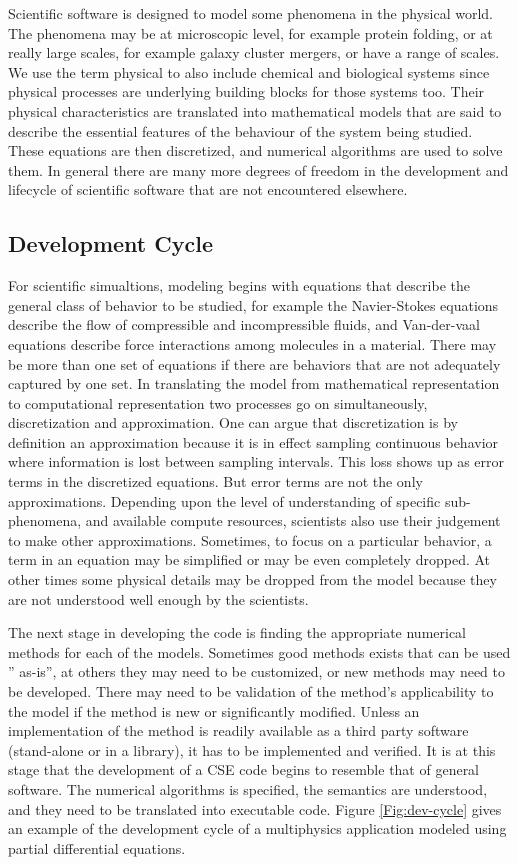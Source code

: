 \label{sec:lifecycle} 
Scientific software is designed to model some phenomena in the
physical world. The phenomena may be at microscopic level, for example
protein folding, or at really large scales, for example galaxy cluster
mergers, or have a range of scales. We use the term physical to also include chemical and
biological systems since physical processes are underlying building
blocks for those systems too. Their physical characteristics are
translated into mathematical models that are said to describe the
essential features of the behaviour of the system being
studied. These equations are then discretized, and numerical algorithms
are used to solve them. In general there are many more degrees of
freedom in the development and lifecycle of scientific software
that are not encountered elsewhere. 

\subsection{Development Cycle}
\label{sec:dev-cycle}
For scientific simualtions, modeling begins with equations that describe the
general class of behavior to be studied, for example the Navier-Stokes
equations describe the flow of compressible and incompressible
fluids, and Van-der-vaal equations describe force interactions among
molecules in a material. There may be more than one set of equations
if there are behaviors that are not adequately captured by one set.
In translating the model from mathematical representation to
computational representation two processes go on simultaneously,
discretization and approximation. One can argue that discretization is
by definition an approximation because it is in effect sampling
continuous behavior where information is lost between sampling
intervals. This loss shows up as error terms in the discretized
equations. But error terms are not the only
approximations. Depending upon the level of understanding of specific
sub-phenomena, and available compute resources, scientists also 
use their judgement to make other approximations. Sometimes, to focus on a
particular behavior, a term in an equation may be simplified or may be even completely
dropped. At other times some physical details may be dropped
from the model because they are not understood well enough by the
scientists. 

The next stage in developing the code is finding the appropriate
numerical methods for each of the models. Sometimes good methods exists that
can be used '' as-is'', at others they may need to be customized, or new
methods may need to be developed. There may need to be validation of
the method's applicability to the model if the method is new or
significantly modified. Unless an implementation of the method is
readily available as a third party software (stand-alone or in a
library), it has to be implemented and verified. It is at this stage
that the development of a CSE code begins to resemble that of general
software. The numerical algorithms is specified, the semantics are
understood, and they need to be translated into executable
code. Figure \ref{Fig:dev-cycle} gives an example of the development
cycle of a multiphysics application modeled using partial differential
equations. 


